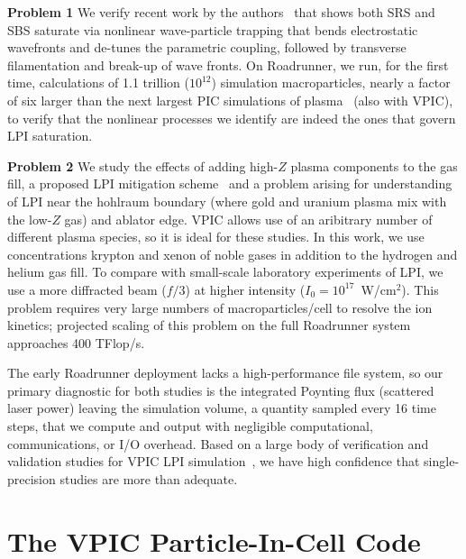 \documentclass[letter,10pt]{article}
\begin{document}
\textbf{Problem 1}
We verify 
recent work by the authors~\cite{} that shows both SRS and SBS saturate via nonlinear 
wave-particle trapping that bends electrostatic wavefronts and de-tunes the parametric 
coupling, followed by transverse filamentation and break-up of wave fronts.  
On Roadrunner, we run, for the first time, calculations of 1.1 trillion ($10^{12}$) 
simulation macroparticles, nearly a factor of six larger than the next largest PIC 
simulations of plasma~\cite{} (also with VPIC), to verify that the nonlinear processes 
we identify are indeed the ones that govern LPI saturation.  

\textbf{Problem 2}
We study the effects of adding high-$Z$ plasma components to the gas fill, a 
proposed LPI mitigation scheme~\cite{} and a problem arising for understanding of 
LPI near the hohlraum boundary (where gold and uranium plasma mix with the low-$Z$ gas) 
and ablator edge.  VPIC allows use of an aribitrary number of different plasma species, 
so it is ideal for these studies.  In this work, we use concentrations krypton and 
xenon of noble gases in addition to the hydrogen and helium gas fill.  To compare 
with small-scale laboratory experiments of LPI, we use a more diffracted beam ($f/3$) 
at higher intensity ($I_0 = 10^{17}$~W/cm$^2$). This problem requires very large numbers
of macroparticles/cell to resolve the ion kinetics; projected scaling of this problem 
on the full Roadrunner system approaches 400 TFlop/s.  

The early Roadrunner deployment lacks a high-performance file system, so our primary 
diagnostic for both studies is the integrated Poynting flux (scattered laser power) 
leaving the simulation volume, a quantity sampled every 16 time steps, that we compute 
and output with negligible computational, communications, or I/O overhead.  Based 
on a large body of verification and validation studies 
for VPIC LPI simulation~\cite{}, we have high confidence that single-precision studies 
are more than adequate. 


\section*{The VPIC Particle-In-Cell Code}
\end{document}
